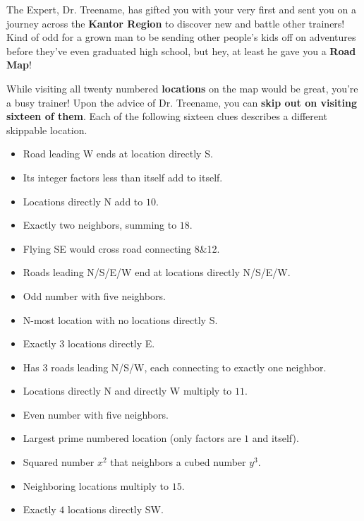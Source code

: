 

The \mappMobimon{} Expert, Dr. Treename, has gifted you with your very
first \mappMobimon{} and sent you on a journey across the
\textbf{Kantor Region} to discover new \mappMobimon{} and battle other
trainers! Kind of odd for a grown man to be sending other people's kids off
on adventures before they've even graduated high school, but hey, at least he
gave you a \textbf{Road Map}!

While visiting all twenty numbered \textbf{locations} on the map would be
great, you're a busy trainer! Upon the advice of Dr. Treename, you can
\textbf{skip out on visiting sixteen of them}.
Each of the following sixteen clues describes a different skippable location.

\begin{multicols}{2}
  \begin{itemize}
    \item Road leading W ends at location directly S. %
    \item Its integer factors less than itself add to itself. %
    \item Locations directly N add to \(10\). %
    \item Exactly two neighbors, summing to \(18\). %
    \item Flying SE would cross road connecting 8\&12. %
    \item Roads leading N/S/E/W end at locations directly N/S/E/W. %
    \item Odd number with five neighbors. %
    \item N-most location with no locations directly S. %
    \item Exactly \(3\) locations directly E. %
    \item Has \(3\) roads leading N/S/W, each connecting to exactly one neighbor. %
    \item Locations directly N and directly W multiply to \(11\). %
    \item Even number with five neighbors. %
    \item Largest prime numbered location (only factors are \(1\) and itself). %
    \item Squared number \(x^2\) that neighbors a cubed number \(y^3\). %
    \item Neighboring locations multiply to \(15\). %
    \item Exactly \(4\) locations directly SW. %
  \end{itemize}
\end{multicols}

